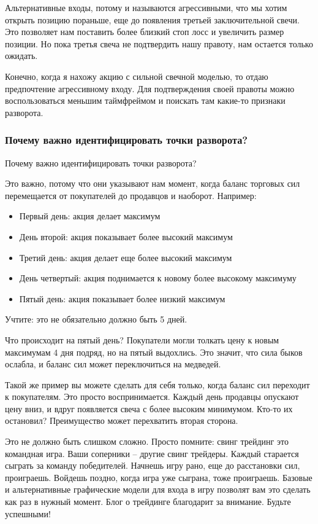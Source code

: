 \documentclass{book}
\begin{document}
Альтернативные входы, потому и называются агрессивными, что мы хотим открыть позицию пораньше, еще до появления третьей заключительной свечи. Это позволяет нам поставить более близкий стоп лосс и увеличить размер позиции. Но пока третья свеча не подтвердить нашу правоту, нам остается только ожидать.

Конечно, когда я нахожу акцию с сильной свечной моделью, то отдаю
предпочтение агрессивному входу. Для подтверждения своей правоты можно
воспользоваться меньшим таймфреймом и поискать там какие-то признаки
разворота.

\subsubsection{Почему важно идентифицировать точки разворота?}

Почему важно идентифицировать точки разворота?

Это важно, потому что они указывают нам момент, когда баланс торговых сил перемещается от покупателей до продавцов и наоборот. Например:
\begin{itemize}
\item     Первый день: акция делает максимум
\item     День второй: акция показывает более высокий максимум
\item     Третий день: акция делает еще более высокий максимум
\item     День четвертый: акция поднимается к новому более высокому максимуму
\item     Пятый день: акция показывает более низкий максимум
\end{itemize}

Учтите: это не обязательно должно быть 5 дней.

Что происходит на пятый день? Покупатели могли толкать цену к новым максимумам 4 дня подряд, но на пятый выдохлись. Это значит, что сила быков ослабла, и баланс сил может переключиться на медведей.

Такой же пример вы можете сделать для себя только, когда баланс сил переходит к покупателям. Это просто воспринимается. Каждый день продавцы опускают цену вниз, и вдруг появляется свеча с более высоким минимумом. Кто-то их остановил? Преимущество может перехватить вторая сторона.

Это не должно быть слишком сложно. Просто помните: свинг трейдинг это командная игра. Ваши соперники – другие свинг трейдеры. Каждый старается сыграть за команду победителей. Начнешь игру рано, еще до расстановки сил, проиграешь. Войдешь поздно, когда игра уже сыграна, тоже проиграешь. Базовые и альтернативные графические модели для входа в игру позволят вам это сделать как раз в нужный момент. Блог о трейдинге благодарит за внимание. Будьте успешными!
\end{document}
